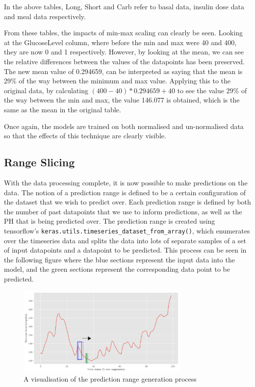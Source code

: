             In the above tables, Long, Short and Carb refer to basal data, insulin dose data and meal data respectively.

            From these tables, the impacts of min-max scaling can clearly be seen. Looking at the GlucoseLevel column, where before the min and max were 40 and 400, they are now 0 and 1 respectively. However, by looking at the mean, we can see the relative differences between the values of the datapoints has been preserved. The new mean value of 0.294659, can be interpreted as saying that the mean is 29\% of the way between the minimum and max value. Applying this to the original data, by calculating $(400-40) * 0.294659 + 40$ to see the value 29\% of the way between the min and max, the value 146.077 is obtained, which is the same as the mean in the original table.

            Once again, the models are trained on both normalised and un-normalised data so that the effects of this technique are clearly visible.

      \subsection{Range Slicing}	

          With the data processing complete, it is now possible to make predictions on the data. The notion of a prediction range is defined to be a certain configuration of the dataset that we wish to predict over. Each prediction range is defined by both the number of past datapoints that we use to inform predictions, as well as the PH that is being predicted over. The prediction range is created using tensorflow's \Verb+keras.utils.timeseries_dataset_from_array()+, which enumerates over the timeseries data and splits the data into lots of separate samples of a set of input datapoints and a datapoint to be predicted. This process can be seen in the following figure where the blue sections represent the input data into the model, and the green sections represent the corresponding data point to be predicted.

          \begin{figure}[H]
            \centering

            \includegraphics[width=0.75\textwidth]{images/InsulinWindow.png} 
            \caption{
             A visualisation of the prediction range generation process
            }
          \end{figure}

